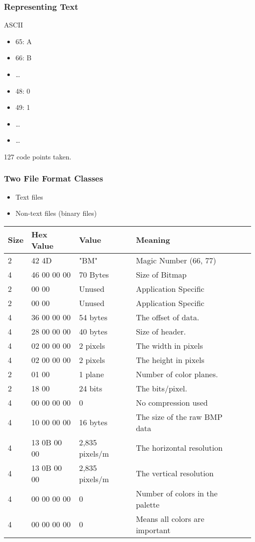 \begin{frame}[fragile]
\frametitle{Representing Text}
\begin{block}{ASCII}
\begin{itemize}
\item 65: A
\item 66: B
\item \ldots
\item 48: 0
\item 49: 1
\item \ldots
\item \ldots
\end{itemize}

127 code points taken.
\end{block}
\end{frame}

\begin{frame}[fragile]
\frametitle{Two File Format Classes}

\begin{itemize}
\item Text files
\item Non-text files (binary files)
\end{itemize}
\end{frame}

\begin{frame}[fragile]
\begin{center}
\begin{tabular}{lllll}
\toprule
Size & Hex Value & Value & Meaning\\
\midrule
2 & 42 4D  &"BM"  &Magic Number (66, 77)\\
4 & 46 00 00 00 & 70 Bytes & Size of Bitmap\\
2 & 00 00 & Unused & Application Specific\\
2 & 00 00 & Unused & Application Specific\\
4 & 36 00 00 00 & 54 bytes & The offset of data.\\
4 & 28 00 00 00 & 40 bytes & Size of header. \\
4 & 02 00 00 00 & 2 pixels & The width in pixels\\
4 & 02 00 00 00 & 2 pixels & The height in pixels\\
2 & 01 00 & 1 plane & Number of color planes.\\
2 & 18 00 & 24 bits & The bits/pixel.\\
4 & 00 00 00 00 & 0 & No compression used\\
4 & 10 00 00 00 & 16 bytes & The size of the raw BMP data\\
4 & 13 0B 00 00 & 2,835 pixels/m& The horizontal resolution\\
4 & 13 0B 00 00 & 2,835 pixels/m& The vertical resolution\\
4 & 00 00 00 00 & 0 & Number of colors in the palette\\
4 & 00 00 00 00 & 0 & Means all colors are important\\
\bottomrule
\end{tabular}
\end{center}
\end{frame}

